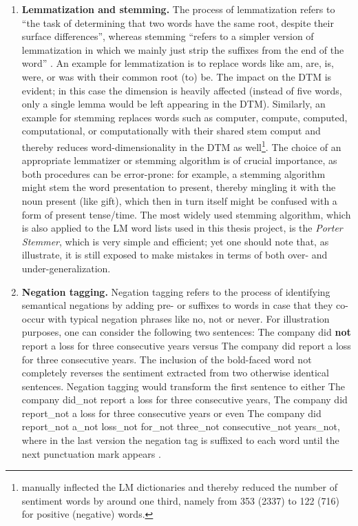 \begin{enumerate}[(1)]
\item \textbf{Lemmatization and stemming.} The process of lemmatization refers to \enquote{the task of determining that two words have the same root, despite their surface differences}, whereas stemming \enquote{refers to a simpler version of lemmatization in which we mainly just strip the suffixes from the end of the word} \parencite[11, 25]{Jurafsky_Draft_2017}. An example for lemmatization is to replace words like \textsf{am}, \textsf{are}, \textsf{is}, \textsf{were}, or \textsf{was} with their common root (to) \textsf{be}. The impact on the DTM is evident; in this case the dimension is heavily affected (instead of five words, only a single lemma would be left appearing in the DTM). Similarly, an example for stemming replaces words such as \textsf{computer, compute, computed, computational}, or \textsf{computationally} with their shared stem \textsf{comput} and thereby reduces word-dimensionality in the DTM as well\footnote{\textcite{Jegadeesh2013} manually inflected the LM dictionaries and thereby reduced the number of sentiment words by around one third, namely from 353 (2337) to 122 (716) for positive (negative) words.}. The choice of an appropriate lemmatizer or stemming algorithm is of crucial importance, as both procedures can be error-prone: for example, a stemming algorithm might stem the word \textsf{presentation} to \textsf{present}, thereby mingling it with the noun \textsf{present} (like gift), which then in turn itself might be confused with a form of \textsf{present} tense/time. The most widely used stemming algorithm, which is also applied to the LM word lists used in this thesis project, is the \emph{Porter Stemmer}, which is very simple and efficient; yet one should note that, as \textcite[25, 26]{Jurafsky_Draft_2017} illustrate, it is still exposed to make mistakes in terms of both over- and under-generalization.

\item \textbf{Negation tagging.} Negation tagging refers to the process of identifying semantical negations by adding pre- or suffixes to words in case that they co-occur with typical negation phrases like \textsf{no, not} or \textsf{never}. For illustration purposes, one can consider the following two sentences: \textsf{The company did \textbf{not} report a loss for three consecutive years} versus \textsf{The company did report a loss for three consecutive years}. The inclusion of the bold-faced word \textsf{not} completely reverses the sentiment extracted from two otherwise identical sentences. Negation tagging would transform the first sentence to either \textsf{The company did\_not report a loss for three consecutive years}, \textsf{The company did report\_not a loss for three consecutive years} or even \textsf{The company did report\_not a\_not loss\_not for\_not three\_not consecutive\_not years\_not}, where in the last version the negation tag is suffixed to each word until the next punctuation mark appears \parencite[81]{Jurafsky_Draft_2017}. 


\end{enumerate}
